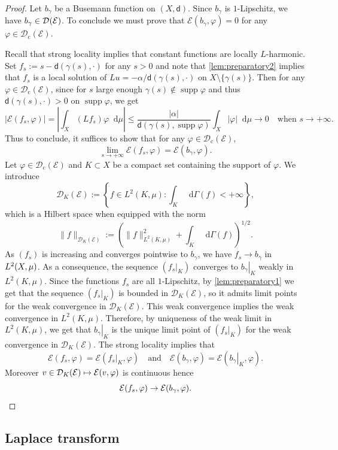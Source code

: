 \documentclass[10pt]{amsart}
\newcommand\mto{\mathchoice{\longmapsto}{\mapsto}{\mapsto}{\mapsto}}
\newcommand{\rmc}{\mathrm{c}}
\let\backslash\setminus
\newcommand{\NoChangel}[1]{%
\expandafter\let\csname old\string#1\endcsname=#1
\let#1=\relax
\newcommand{#1}{\mathcode`l="716C\csname old\string#1\endcsname\mathcode`l="7160 }%
}
\theoremstyle{plain}
\theoremstyle{definition}
\newcommand{\cE}{\mathcal{E}}
\newcommand{\cD}{\mathcal{D}}
\let\phi\varphi
\newcommand{\di}{\mathop{}\!\mathrm{d}}
\newcommand{\loc}{\mathrm{loc}}\NoChangel{\loc}
\DeclareMathOperator{\supp}{supp}
\newcommand{\dist}{\mathsf{d}}
\begin{document}
\begin{proof}
Let $b_\gamma$ be a Busemann function on $(X,\dist)$. Since $b_\gamma$ is $1$-Lipschitz, we have $b_\gamma \in \cD_{\loc}(\cE)$. To conclude we must prove that $\cE(b_\gamma,\phi)=0$ for any $\phi \in \cD_\rmc(\cE)$.

Recall that strong locality implies that constant functions are locally $L$-harmonic. Set $f_s:=s-\dist(\gamma(s),\cdot)$ for any $s>0$ and note that \eqref{lem:preparatory2} implies that $f_s$ is a local solution of $Lu = -\alpha/\dist(\gamma(s),\cdot)$ on $X \backslash \{\gamma(s)\}$. Then for any $\phi \in \cD_\rmc(\cE)$, since for $s$ large enough $\gamma(s) \notin \supp \phi$ and thus $\dist(\gamma(s),\cdot)>0$ on $\supp \phi$, we get
\[
|\cE(f_s,\phi)|= \left|\int_X (Lf_s) \phi \di \mu\right| \le \frac{|\alpha|}{\dist(\gamma(s),\supp \phi)} \int_X |\phi| \di \mu \to 0 \quad \text{when $s \to +\infty$}.
\]
Thus to conclude, it suffices to show that for any $\phi \in \cD_\rmc(\cE)$,
\[
\lim_{s \to +\infty} \cE(f_s,\phi)=\cE(b_\gamma,\phi).
\]
Let $\phi \in \cD_\rmc(\cE)$ and $K\subset X$ be a compact set containing the support of $\varphi$.
We introduce
\[
\cD_{K}(\cE):=\left\{ f \in L^2(K,\mu): \int_{K}\di \Gamma(f)<+\infty \right\},
\]
which is a Hilbert space when equipped with the norm
\[
\|f\|_{\cD_{K}(\cE)}:=\left(\|f\|^2_{L^2(K,\mu)} + \int_{K}\di \Gamma(f)\right)^{1/2}.
\]
As $(f_s)$ is increasing and converges pointwise to $b_\gamma$, we have $f_s \to b_\gamma$ in $L^2_{\loc}(X,\mu)$. As a consequence, the sequence $(\left.f_s\right|_K)$ converges to $\left.b_\gamma\right|_K$ weakly in $L^2(K,\mu)$. Since the functions $f_s$ are all $1$-Lipschitz, by \eqref{lem:preparatory1} we get that the sequence $(\left.f_s\right|_K)$ is bounded in $\cD_{K}(\cE)$, so it admits limit points for the weak convergence in $\cD_{K}(\cE)$. This weak convergence implies the weak convergence in $L^2(K,\mu)$. Therefore, by uniqueness of the weak limit in $L^2(K,\mu)$, we get that $\left.b_\gamma\right|_K$ is the unique limit point of $(\left.f_s\right|_K)$ for the weak convergence in $\cD_{K}(\cE)$. The strong locality implies that
\[
\cE(f_s,\phi)=\cE(\left.f_s\right|_K,\phi)\quad\text{and}\quad \cE(b_\gamma,\phi)=\cE(\left.b_\gamma\right|_K,\phi).
\]
Moreover $v\in \cD_{K}(\cE)\mto \cE(v,\phi)$ is continuous hence
\[
\cE(f_s,\phi)\to \cE(b_\gamma,\phi).\qedhere
\]
\end{proof}

\subsection*{Laplace transform}
\end{document}
